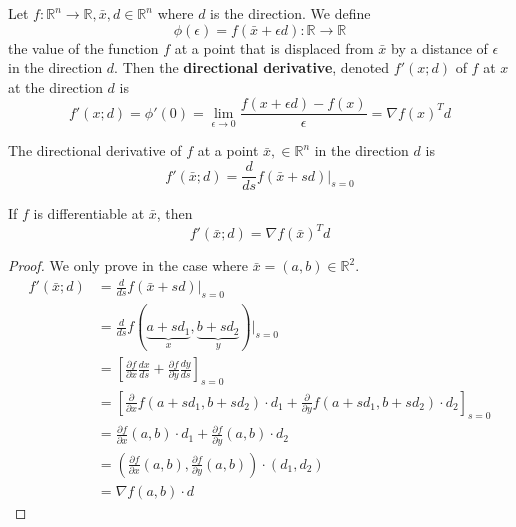 \begin{lemma}
    Let $f: \mathbb R^n \rightarrow \mathbb R, \bar x, d \in \mathbb R^n$ where $d$ is the direction. We define
    $$\phi (\epsilon) = f(\bar x + \epsilon d): \mathbb R \rightarrow \mathbb R$$ the value of the function $f$ at a point that is displaced from $\bar x$ by a distance of $\epsilon$ in the direction $d$.
    Then the \textbf{directional derivative}, denoted $f'(x; d)$ of $f$ at $x$ at the direction $d$ is
    $$f'(x; d) = \phi'(0) = \lim_{\epsilon \rightarrow 0} \frac{f(x + \epsilon d) - f(x)}{\epsilon} = \nabla f(x)^T d$$
\end{lemma}
\begin{definition}
    The directional derivative of $f$ at a point $\bar x, \in \mathbb R^n$ in the direction $d$ is $$f'(\bar x; d) = \frac{d}{ds} f(\bar x + sd) \bigg|_{s = 0}$$
\end{definition}
\begin{theorem}[]
    If $f$ is differentiable at $\bar x$, then $$f'(\bar x; d) = \nabla f(\bar x)^T d$$
\end{theorem}
\begin{proof}[Proof]
    We only prove in the case where $\bar x = (a, b) \in \mathbb R^2$.
    \begin{align*}
        f'(\bar x; d) &= \frac{d}{ds} f(\bar x + sd) \bigg|_{s = 0} \\
        &= \frac{d}{ds} f(\underbrace{a + sd_1}_{x}, \underbrace{b + sd_2}_{y}) \bigg|_{s = 0} \\
        &= \left[\frac{\partial f}{\partial x} \frac{dx}{ds} + \frac{\partial f}{\partial y}\frac{dy}{ds}\right]_{s=0} \tag*{Chain rule}\\
        &= \left[\frac{\partial}{\partial x}f(a + sd_1, b + sd_2) \cdot d_1 + \frac{\partial}{\partial y}f(a + sd_1, b + sd_2) \cdot d_2\right]_{s=0} \\
        &= \frac{\partial f}{\partial x} (a,b) \cdot d_1 + \frac{\partial f}{\partial y}(a,b) \cdot d_2 \\
        &= \left(\frac{\partial f}{\partial x}(a,b), \frac{\partial f}{\partial y} (a,b)\right) \cdot (d_1, d_2) \\
        &= \nabla f(a,b) \cdot d
    \end{align*}
\end{proof}
